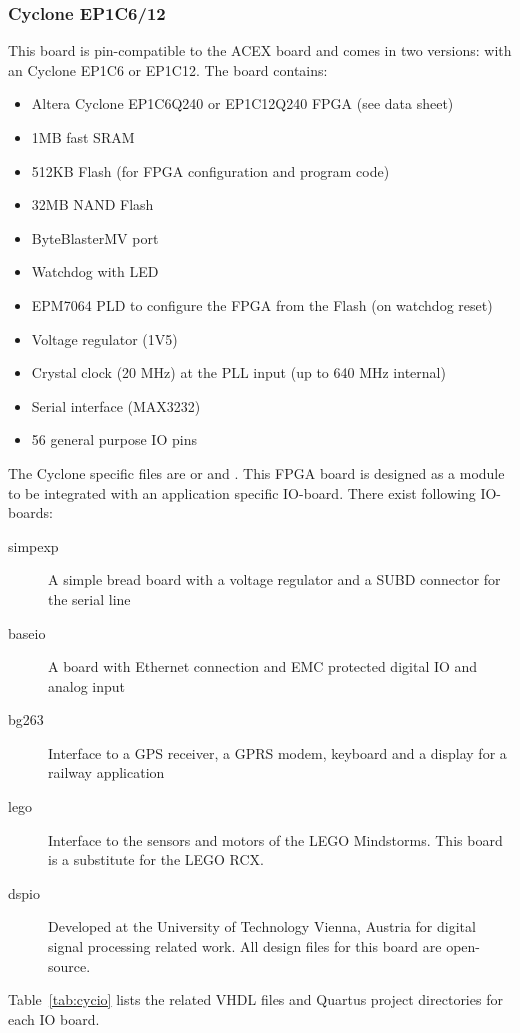 \subsubsection{Cyclone EP1C6/12}

This board is pin-compatible to the ACEX board and comes in two
versions: with an Cyclone EP1C6 or EP1C12. The board contains:

\begin{itemize}
    \item Altera Cyclone EP1C6Q240 or EP1C12Q240 FPGA (see data sheet)
    \item 1MB fast SRAM
    \item 512KB Flash (for FPGA configuration and program code)
    \item 32MB NAND Flash
    \item ByteBlasterMV port
    \item Watchdog with LED
    \item EPM7064 PLD to configure the FPGA from the Flash (on watchdog reset)
    \item Voltage regulator (1V5)
    \item Crystal clock (20 MHz) at the PLL input (up to 640 MHz internal)
    \item Serial interface (MAX3232)
    \item 56 general purpose IO pins
\end{itemize}

The Cyclone specific files are  or 
and . This FPGA board is designed as a module to be
integrated with an application specific IO-board. There exist
following IO-boards:
%
\begin{description}
    \item[simpexp] A simple bread board with a voltage regulator and
    a SUBD connector for the serial line
    \item[baseio] A board with Ethernet connection and EMC protected
    digital IO and analog input
    \item[bg263] Interface to a GPS receiver, a GPRS modem, keyboard
    and a display for a railway application
    \item[lego] Interface to the sensors and motors of the LEGO
    Mindstorms. This board is a substitute for the LEGO RCX.
    \item[dspio] Developed at the University of Technology Vienna, Austria for
    digital signal processing related work. All design files for this
    board are open-source.
\end{description}
%
Table~\ref{tab:cycio} lists the related VHDL files and Quartus
project directories for each IO board.

